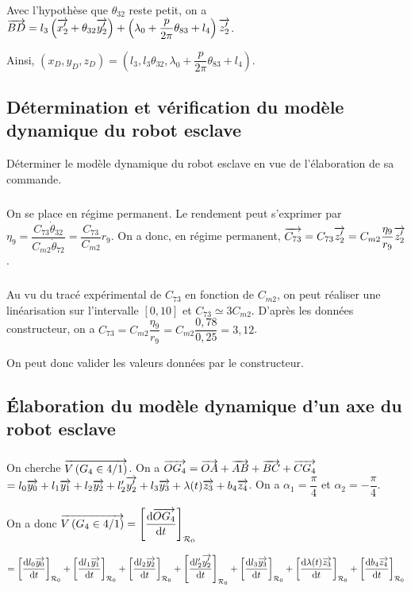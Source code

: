 \documentclass[10pt,fleqn]{article} %
\begin{document}
 Avec l'hypothèse que $\theta_{32}$ reste petit, on a  $\overrightarrow{BD}=l_3\left(  \overrightarrow{x_2'} + \theta_{32} \overrightarrow{y_2'}  \right)+\left( \lambda_0 + \dfrac{p}{2\pi} \theta_{83} +l_4\right)\overrightarrow{z_2'}$.
 
  Ainsi, $\left(x_D,y_D,z_D\right)=
\left( l_3,l_3 \theta_{32}, \lambda_0 + \dfrac{p}{2\pi} \theta_{83} +l_4\right)$.

\subparagraph{}%

\subsection{Détermination et vérification du modèle dynamique du robot esclave}
\begin{obj}
Déterminer le modèle dynamique du robot esclave en vue de l’élaboration de sa commande.
\end{obj}

\subparagraph{}%
On se place en régime permanent. Le rendement peut s'exprimer par 
$\eta_9 =\dfrac{C_{73}\dot{\theta}_{32}}{C_{m2}\dot{\theta}_{72}}=\dfrac{C_{73}}{C_{m2}}r_9$. 
On a donc, en régime permanent, $\overrightarrow{C_{73}}=C_{73}\overrightarrow{z'_2}=C_{m2}\dfrac{\eta_9}{r_9}\overrightarrow{z'_2}$.


\subparagraph{}%
Au vu du tracé expérimental de $C_{73}$ en fonction de $C_{m2}$, on peut réaliser une linéarisation sur l'intervalle $[0,10]$ et $C_{73}\simeq 3 C_{m2}$. 
D'après les données constructeur, on a $C_{73}=C_{m2}\dfrac{\eta_9}{r_9}=C_{m2}\dfrac{0,78}{0,25}=3,12$.

On peut donc valider les valeurs données par le constructeur.
\subsection{Élaboration du modèle dynamique d’un axe du robot esclave}


\subparagraph{}%
\subparagraph{}%
\subparagraph{}%
On cherche $\overrightarrow{V\left( {G_4} \in {4}/{1}\right)}$. On a $\overrightarrow{OG_4}=\overrightarrow{OA}+\overrightarrow{AB}+\overrightarrow{BC}+\overrightarrow{CG_4}$ $=l_0\overrightarrow{y_0}+l_1\overrightarrow{y_1}+l_2\overrightarrow{y_2}+l_2'\overrightarrow{y_2'}+l_3\overrightarrow{y_3}+\lambda(t)\overrightarrow{z_3}+b_4\overrightarrow{z_4}$.
On a $\alpha_1=\dfrac{\pi}{4}$ et $\alpha_2=-\dfrac{\pi}{4}$.

On a donc $\overrightarrow{V\left( {G_4} \in {4}/{1}\right)}= \left[\dfrac{\text{d} \overrightarrow{OG_4}}{\text{d} t}\right]_{\mathcal{R}_{0}} $ 

$= 
\left[\dfrac{\text{d} l_0\overrightarrow{y_0}}{\text{d} t}\right]_{\mathcal{R}_{0}}+
\left[\dfrac{\text{d} l_1\overrightarrow{y_1}}{\text{d} t}\right]_{\mathcal{R}_{0}}+
\left[\dfrac{\text{d} l_2\overrightarrow{y_2}}{\text{d} t}\right]_{\mathcal{R}_{0}}+
\left[\dfrac{\text{d} l_2'\overrightarrow{y_2'}}{\text{d} t}\right]_{\mathcal{R}_{0}}+
\left[\dfrac{\text{d} l_3\overrightarrow{y_3}}{\text{d} t}\right]_{\mathcal{R}_{0}}+
\left[\dfrac{\text{d} \lambda(t)\overrightarrow{z_3}}{\text{d} t}\right]_{\mathcal{R}_{0}}+
\left[\dfrac{\text{d} b_4\overrightarrow{z_4}}{\text{d} t}\right]_{\mathcal{R}_{0}}$
\end{document}
